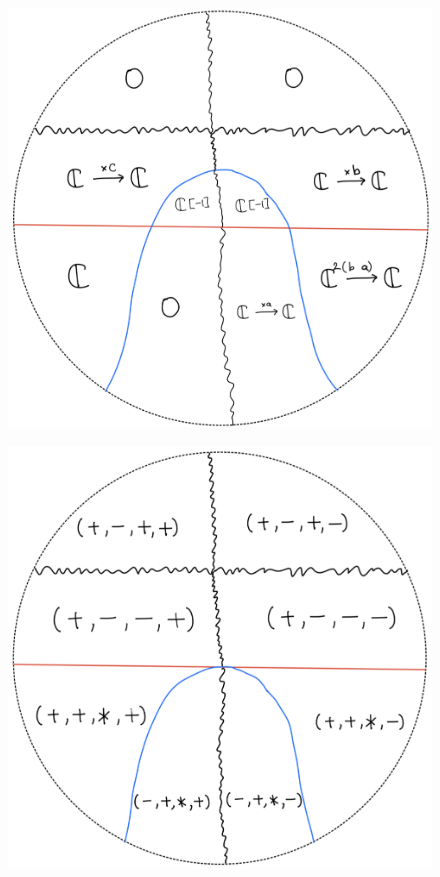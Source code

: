 \begin{figure}[H]
    \centering
    \includegraphics[scale = 0.45]{diagrams/cobord'2/35.png} 
    \caption{}
    \label{fig:your-label}
\end{figure}
\begin{figure}[H]
    \centering
    \includegraphics[scale = 0.45]{diagrams/cobord'2/36.png} 
    \caption{}
    \label{fig:your-label}
\end{figure}
